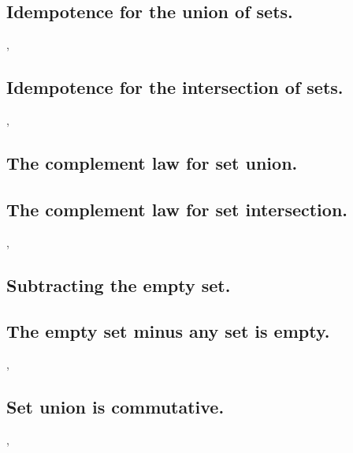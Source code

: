 \documentclass[preview]{standalone}
\begin{document}
\subsection{Idempotence for the union of sets.}

\sep
\pagebreak


\subsection{Idempotence for the intersection of sets.}

\sep


\subsection{The complement law for set union.}

\pagebreak


\subsection{The complement law for set intersection.}

\sep


\subsection{Subtracting the empty set.}

\pagebreak


\subsection{The empty set minus any set is empty.}

\sep


\subsection{Set union is commutative.}

\sep
\pagebreak
\end{document}
